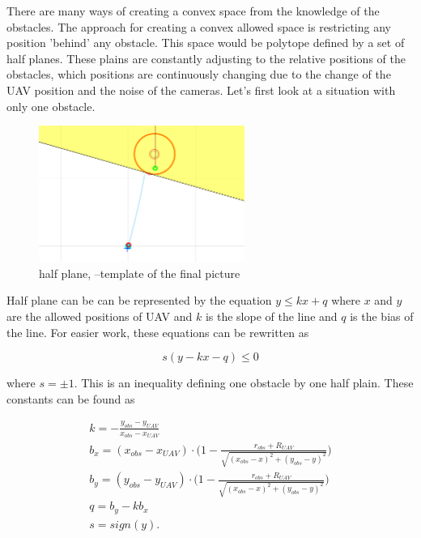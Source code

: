\documentclass[a4paper,11pt,titlepage]{article}
\begin{document}
There are many ways of creating a convex space from the knowledge of the obstacles.
The approach for creating a convex allowed space is restricting any position 'behind' any obstacle. This space would be polytope defined by a set of half planes. These plains are constantly adjusting to the relative positions of the obstacles, which positions are continuously changing due to the change of the UAV position and the noise of the cameras. Let's first look at a situation with only one obstacle. 

\begin{figure}[h]
\begin{center}
\includegraphics[width=0.6\textwidth]{fig/polorovina.png} 
\caption{half plane, --template of the final picture}
\label{fig:half_plain}
\end{center}
\end{figure}

Half plane can be can be represented by the equation $y \leq kx + q$  where $x$ and $y$ are the allowed positions of UAV and $k$ is the slope of the line and $q$ is the bias of the line. For easier work, these equations can be rewritten as

\begin{equation}
\label{eq:simple_obstacle_cond}
s(y - kx - q) \leq 0
\end{equation}

where $s = \pm 1$. This is an inequality defining one obstacle by one half plain. 
These constants can be found as 

\begin{equation}
\label{eq:obstacle_constants}
\begin{split}
k = -\frac{y_{obs} - y_{UAV}}{x_{obs} - x_{UAV}}\\
b_x = (x_{obs}-x_{UAV})\cdot \big(1-\frac{r_{obs}+R_{UAV}}{\sqrt{(x_{obs} - x)^2 + (y_{obs} - y)^2}} \big)\\
b_y = (y_{obs}-y_{UAV})\cdot \big(1-\frac{r_{obs}+R_{UAV}}{\sqrt{(x_{obs} - x)^2 + (y_{obs} - y)^2}} \big)\\
q = b_y - kb_x\\
s = sign(y).
\end{split}
\end{equation}
\end{document}
